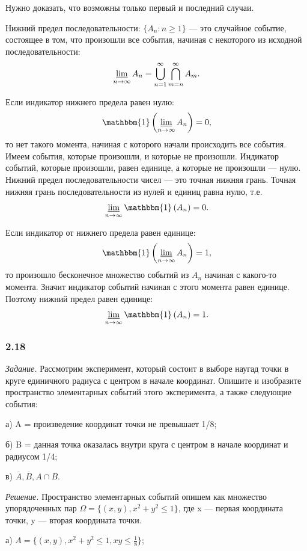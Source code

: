 \documentclass{book}
\begin{document}
Нужно доказать, что возможны только первый и последний случаи.

Нижний предел последовательности:
$\{ A_n : n \geq 1 \}$ --- это случайное событие, состоящее в том, что произошли все события, начиная с некоторого из исходной последовательности:
$$\varliminf \limits_{n\to\infty} A_n = \bigcup \limits_{n=1}^\infty \bigcap \limits_{m=n}^\infty A_m. $$

Если индикатор нижнего предела равен нулю:
$$ \mathbbm{1} \left( \varliminf \limits_{n\to\infty} A_n \right) = 0 , $$
то нет такого момента, начиная с которого начали происходить все события.
Имеем события, которые произошли, и которые не произошли.
Индикатор событий, которые произошли, равен единице, а которые не произошли --- нулю.
Нижний предел последовательности чисел --- это точная нижняя грань.
Точная нижняя грань последовательности из нулей и единиц равна нулю, т.е.
$$\varliminf \limits_{n\to\infty} \mathbbm{1} \left( A_n \right) = 0 . $$

Если индикатор от нижнего предела равен единице:
$$ \mathbbm{1} \left( \varliminf \limits_{n\to\infty} A_n \right) = 1 , $$
то произошло бесконечное множество событий из $A_n$ начиная с какого-то момента.
Значит индикатор событий начиная с этого момента равен единице.
Поэтому нижний предел равен единице:
$$\varliminf \limits_{n\to\infty} \mathbbm{1} \left( A_n \right) = 1 . $$

\subsubsection*{2.18}

\textit{Задание.} Рассмотрим эксперимент, который состоит в выборе наугад точки в круге единичного радиуса с центром в начале координат.
Опишите и изобразите пространство элементарных событий этого эксперимента, а также следующие события:

а) A = {произведение координат точки не превышает 1/8};

б) B = {данная точка оказалась внутри круга с центром в начале координат и радиусом 1/4};

в) $ \overline{ A },
\overline{ B },
A \cap B $.

\textit{Решение.}
Пространство элементарных событий опишем как множество упорядоченных пар
$ \Omega =
\{ (x, y), x^2 + y^2 \leq 1 \} $,
где x --- первая координата точки, y --- вторая координата точки.

а) $ A =
\{ (x, y), x^2 + y^2 \leq 1, xy \leq \frac{ 1 }{ 8 } \} $;
\end{document}
